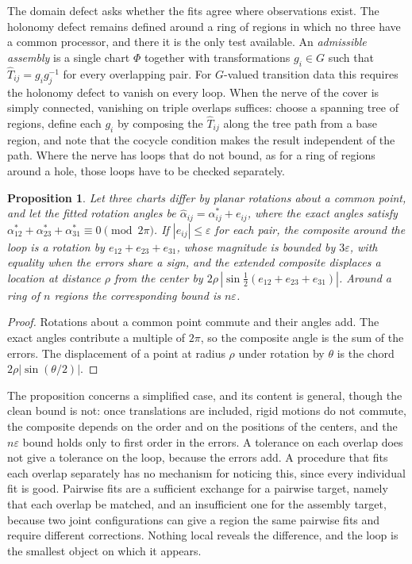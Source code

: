 \documentclass[11pt]{article}
\theoremstyle{definition}
\theoremstyle{plain}
\newtheorem{proposition}{Proposition}
\theoremstyle{remark}
\begin{document}
The domain defect asks whether the fits agree where observations exist. The holonomy defect remains defined around a ring of regions in which no three have a common processor, and there it is the only test available. An \emph{admissible assembly} is a single chart $\Phi$ together with transformations $g_i\in G$ such that $\hat T_{ij}=g_ig_j^{-1}$ for every overlapping pair. For $G$-valued transition data this requires the holonomy defect to vanish on every loop. When the nerve of the cover is simply connected, vanishing on triple overlaps suffices: choose a spanning tree of regions, define each $g_i$ by composing the $\hat T_{ij}$ along the tree path from a base region, and note that the cocycle condition makes the result independent of the path. Where the nerve has loops that do not bound, as for a ring of regions around a hole, those loops have to be checked separately.

\begin{proposition}
Let three charts differ by planar rotations about a common point, and let the fitted rotation angles be $\hat\alpha_{ij}=\alpha_{ij}^{*}+e_{ij}$, where the exact angles satisfy $\alpha_{12}^{*}+\alpha_{23}^{*}+\alpha_{31}^{*}\equiv 0\pmod{2\pi}$. If $|e_{ij}|\le\varepsilon$ for each pair, the composite around the loop is a rotation by $e_{12}+e_{23}+e_{31}$, whose magnitude is bounded by $3\varepsilon$, with equality when the errors share a sign, and the extended composite displaces a location at distance $\rho$ from the center by $2\rho\,|\sin\tfrac12(e_{12}+e_{23}+e_{31})|$. Around a ring of $n$ regions the corresponding bound is $n\varepsilon$.
\end{proposition}

\begin{proof}
Rotations about a common point commute and their angles add. The exact angles contribute a multiple of $2\pi$, so the composite angle is the sum of the errors. The displacement of a point at radius $\rho$ under rotation by $\theta$ is the chord $2\rho|\sin(\theta/2)|$.
\end{proof}

The proposition concerns a simplified case, and its content is general, though the clean bound is not: once translations are included, rigid motions do not commute, the composite depends on the order and on the positions of the centers, and the $n\varepsilon$ bound holds only to first order in the errors. A tolerance on each overlap does not give a tolerance on the loop, because the errors add. A procedure that fits each overlap separately has no mechanism for noticing this, since every individual fit is good. Pairwise fits are a sufficient exchange for a pairwise target, namely that each overlap be matched, and an insufficient one for the assembly target, because two joint configurations can give a region the same pairwise fits and require different corrections. Nothing local reveals the difference, and the loop is the smallest object on which it appears.
\end{document}
